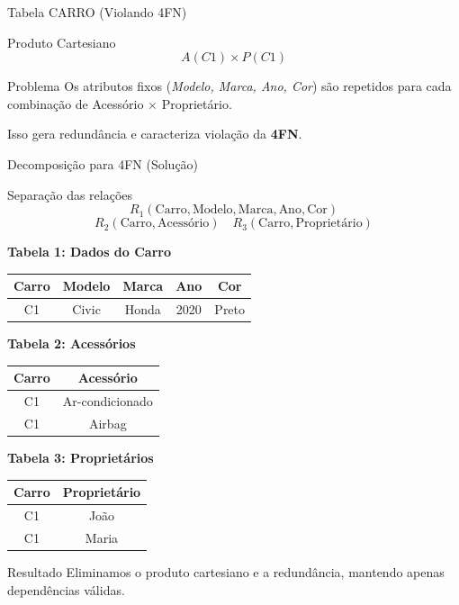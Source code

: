 \documentclass[9pt]{beamer}
\begin{document}
\begin{frame}{Tabela CARRO (Violando 4FN)}
\vspace{0.3cm}

\begin{block}{Produto Cartesiano}
\[
A(C1) \times P(C1)
\]
\end{block}

\vspace{0.2cm}

\begin{alertblock}{Problema}
Os atributos fixos (\textit{Modelo, Marca, Ano, Cor}) são repetidos para cada combinação de 
Acessório $\times$ Proprietário.

\vspace{0.1cm}

Isso gera redundância e caracteriza violação da \textbf{4FN}.
\end{alertblock}

\end{frame}\begin{frame}{Decomposição para 4FN (Solução)}
\small

\begin{block}{Separação das relações}
\[
R_1(\text{Carro}, \text{Modelo}, \text{Marca}, \text{Ano}, \text{Cor})
\]
\[
R_2(\text{Carro}, \text{Acessório})
\quad
R_3(\text{Carro}, \text{Proprietário})
\]
\end{block}

\vspace{0.3cm}

\centering
\textbf{Tabela 1: Dados do Carro}
\begin{tabular}{|c|c|c|c|c|}
\hline
Carro & Modelo & Marca & Ano & Cor \\ \hline
C1 & Civic & Honda & 2020 & Preto \\ \hline
\end{tabular}

\vspace{0.2cm}

\textbf{Tabela 2: Acessórios}
\begin{tabular}{|c|c|}
\hline
Carro & Acessório \\ \hline
C1 & Ar-condicionado \\ \hline
C1 & Airbag \\ \hline
\end{tabular}

\vspace{0.2cm}

\textbf{Tabela 3: Proprietários}
\begin{tabular}{|c|c|}
\hline
Carro & Proprietário \\ \hline
C1 & João \\ \hline
C1 & Maria \\ \hline
\end{tabular}

\vspace{0.3cm}

\begin{alertblock}{Resultado}
Eliminamos o produto cartesiano e a redundância, mantendo apenas dependências válidas.
\end{alertblock}

\end{frame}
\end{document}

